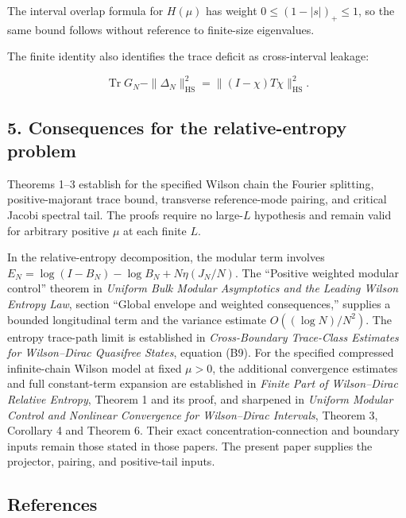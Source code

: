 \documentclass[
  10pt,
  a4paper,
]{article}
\begin{document}
The interval overlap formula for \(H(\mu)\) has weight \(0\le(1-|s|)_+\le1\), so the same bound follows without reference to finite-size eigenvalues.

The finite identity also identifies the trace deficit as cross-interval leakage:

\[
 \operatorname{Tr}G_N-\|\Delta_N\|_{\mathrm{HS}}^2
 =\| (I-\chi)T\chi\|_{\mathrm{HS}}^2.
\]

\subsection{5. Consequences for the relative-entropy problem}\label{consequences-for-the-relative-entropy-problem}

Theorems 1--3 establish for the specified Wilson chain the Fourier splitting, positive-majorant trace bound, transverse reference-mode pairing, and critical Jacobi spectral tail. The proofs require no large-\(L\) hypothesis and remain valid for arbitrary positive \(\mu\) at each finite \(L\).

In the relative-entropy decomposition, the modular term involves \(E_N=\log(I-B_N)-\log B_N+N\eta(J_N/N)\). The ``Positive weighted modular control'' theorem in \emph{Uniform Bulk Modular Asymptotics and the Leading Wilson Entropy Law}, section ``Global envelope and weighted consequences,'' supplies a bounded longitudinal term and the variance estimate \(O((\log N)/N^2)\). The entropy trace-path limit is established in \emph{Cross-Boundary Trace-Class Estimates for Wilson--Dirac Quasifree States}, equation (B9). For the specified compressed infinite-chain Wilson model at fixed \(\mu>0\), the additional convergence estimates and full constant-term expansion are established in \emph{Finite Part of Wilson--Dirac Relative Entropy}, Theorem 1 and its proof, and sharpened in \emph{Uniform Modular Control and Nonlinear Convergence for Wilson--Dirac Intervals}, Theorem 3, Corollary 4 and Theorem 6. Their exact concentration-connection and boundary inputs remain those stated in those papers. The present paper supplies the projector, pairing, and positive-tail inputs.

\subsection{References}\label{references}
\end{document}
